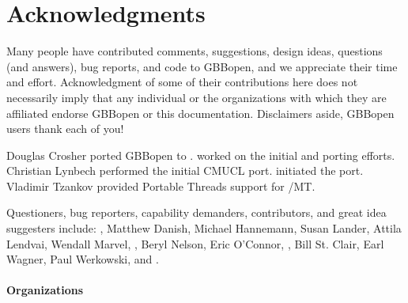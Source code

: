 


\section*{Acknowledgments}
\T{}%
\label{sec:acknowledgments}%
%

Many people have contributed comments, suggestions, design ideas, questions
(and answers), bug reports, and code to GBBopen, and we appreciate their time
and effort.  Acknowledgment of some of their contributions here does not
necessarily imply that any individual or the organizations with which they are
affiliated endorse GBBopen or this documentation.  Disclaimers aside, GBBopen
users thank each of you!

Douglas Crosher ported GBBopen to .   worked on the initial  and
 porting efforts.
Christian Lynbech performed the initial CMUCL port.   initiated the
 port.
Vladimir Tzankov provided Portable Threads support for /MT.

Questioners, bug reporters, capability demanders, contributors, and great idea
suggesters include: , Matthew
Danish, Michael Hannemann, Susan Lander, Attila Lendvai, Wendall Marvel,
, Beryl
Nelson, Eric O'Connor, , Bill St. Clair, Earl Wagner, Paul
Werkowski, and .

\paragraph{Organizations}

